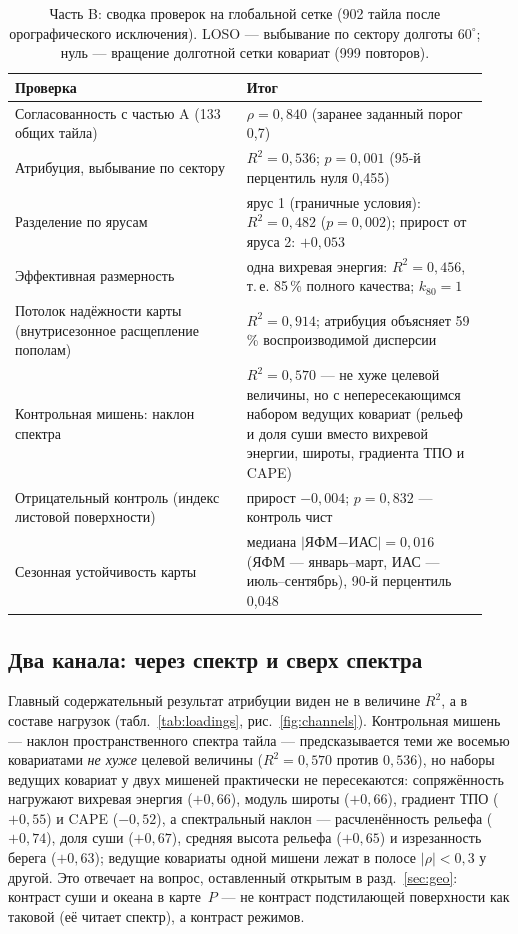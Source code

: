 \documentclass[11pt,a4paper]{article}
\begin{document}
\begin{table}[t]
\centering
\caption{Часть B: сводка проверок на глобальной сетке (902 тайла после орографического исключения). LOSO --- выбывание по сектору долготы $60^\circ$; нуль --- вращение долготной сетки ковариат (999 повторов).}
\label{tab:armB}
\small
\begin{tabular}{@{}p{0.46\linewidth}p{0.48\linewidth}@{}}
\toprule
Проверка & Итог\\
\midrule
Согласованность с частью A (133 общих тайла) & $\rho=0{,}840$ (заранее заданный порог 0,7)\\
Атрибуция, выбывание по сектору & $R^2=0{,}536$; $p=0{,}001$ (95-й перцентиль нуля 0,455)\\
Разделение по ярусам & ярус 1 (граничные условия): $R^2=0{,}482$ ($p=0{,}002$); прирост от яруса 2: $+0{,}053$\\
Эффективная размерность & одна вихревая энергия: $R^2=0{,}456$, т.\,е. 85\,\% полного качества; $k_{80}=1$\\
Потолок надёжности карты (внутрисезонное расщепление пополам) & $R^2=0{,}914$; атрибуция объясняет 59\,\% воспроизводимой дисперсии\\
Контрольная мишень: наклон спектра & $R^2=0{,}570$ --- не хуже целевой величины, но с непересекающимся набором ведущих ковариат (рельеф и доля суши вместо вихревой энергии, широты, градиента ТПО и CAPE)\\
Отрицательный контроль (индекс листовой поверхности) & прирост $-0{,}004$; $p=0{,}832$ --- контроль чист\\
Сезонная устойчивость карты & медиана $\lvert$ЯФМ$-$ИАС$\rvert=0{,}016$ (ЯФМ --- январь--март, ИАС --- июль--сентябрь), 90-й перцентиль 0,048\\
\bottomrule
\end{tabular}
\end{table}

\subsection{Два канала: через спектр и сверх спектра}
\label{sec:channels}

Главный содержательный результат атрибуции виден не в величине $R^2$, а в составе нагрузок (табл.~\ref{tab:loadings}, рис.~\ref{fig:channels}). Контрольная мишень --- наклон пространственного спектра тайла --- предсказывается теми же восемью ковариатами \emph{не хуже} целевой величины ($R^2=0{,}570$ против $0{,}536$), но наборы ведущих ковариат у двух мишеней практически не пересекаются: сопряжённость нагружают вихревая энергия ($+0{,}66$), модуль широты ($+0{,}66$), градиент ТПО ($+0{,}55$) и CAPE ($-0{,}52$), а спектральный наклон --- расчленённость рельефа ($+0{,}74$), доля суши ($+0{,}67$), средняя высота рельефа ($+0{,}65$) и изрезанность берега ($+0{,}63$); ведущие ковариаты одной мишени лежат в полосе $\lvert\rho\rvert<0{,}3$ у другой. Это отвечает на вопрос, оставленный открытым в разд.~\ref{sec:geo}: контраст суши и океана в карте~$P$ --- не контраст подстилающей поверхности как таковой (её читает спектр), а контраст режимов.
\end{document}
